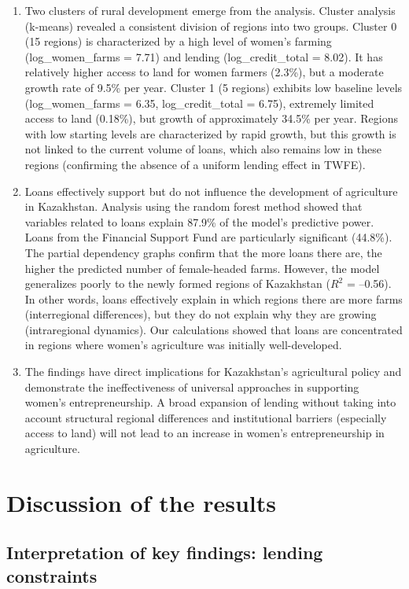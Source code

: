 ﻿\documentclass[pdflatex,sn-mathphys-ay]{sn-jnl}
\begin{document}
\begin{enumerate}
\item Two clusters of rural development emerge from the analysis.
Cluster analysis (k-means) revealed a consistent division of regions
into two groups. Cluster 0 (15 regions) is characterized by a high
level of women's farming (log\_women\_farms = 7.71) and lending
(log\_credit\_total = 8.02). It has relatively higher access to land
for women farmers (2.3\%), but a moderate growth rate of 9.5\% per
year. Cluster 1 (5 regions) exhibits low baseline levels
(log\_women\_farms = 6.35, log\_credit\_total = 6.75), extremely
limited access to land (0.18\%), but growth of approximately 34.5\% per
year. Regions with low starting levels are characterized by rapid
growth, but this growth is not linked to the current volume of loans,
which also remains low in these regions (confirming the absence of a
uniform lending effect in TWFE).

\item Loans effectively support but do not influence the development of
agriculture in Kazakhstan. Analysis using the random forest method
showed that variables related to loans explain 87.9\% of the model's
predictive power. Loans from the Financial Support Fund are particularly
significant (44.8\%). The partial dependency graphs confirm that the
more loans there are, the higher the predicted number of female-headed
farms. However, the model generalizes poorly to the newly formed regions
of Kazakhstan ($R^2$ = --0.56). In other words, loans effectively explain
in which regions there are more farms (interregional differences), but
they do not explain why they are growing (intraregional dynamics). Our
calculations showed that loans are concentrated in regions where women's
agriculture was initially well-developed.

\item The findings have direct implications for Kazakhstan's
agricultural policy and demonstrate the ineffectiveness of universal
approaches in supporting women's entrepreneurship. A broad expansion of
lending without taking into account structural regional differences and
institutional barriers (especially access to land) will not lead to an
increase in women's entrepreneurship in agriculture.
\end{enumerate}

\section{Discussion of the results}

\subsection{Interpretation of key findings: lending constraints}
\end{document}

